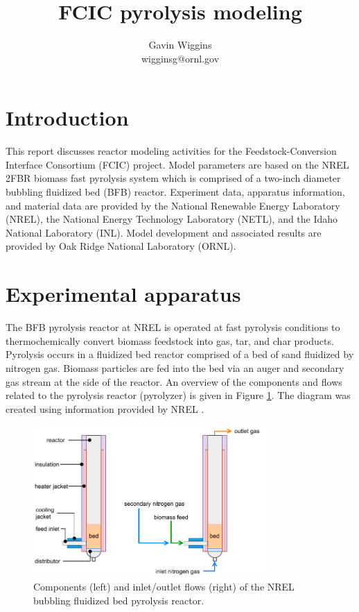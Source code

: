 \documentclass[12pt,titlepage]{article}
\title{FCIC pyrolysis modeling}
\author{Gavin Wiggins \\ wigginsg@ornl.gov}
\begin{document}
\hypersetup{pageanchor=false}
\maketitle
\tableofcontents
\newpage

\section{Introduction}

This report discusses reactor modeling activities for the Feedstock-Conversion Interface Consortium (FCIC) project. Model parameters are based on the NREL 2FBR biomass fast pyrolysis system which is comprised of a two-inch diameter bubbling fluidized bed (BFB) reactor. Experiment data, apparatus information, and material data are provided by the National Renewable Energy Laboratory (NREL), the National Energy Technology Laboratory (NETL), and the Idaho National Laboratory (INL). Model development and associated results are provided by Oak Ridge National Laboratory (ORNL).

\section{Experimental apparatus}

The BFB pyrolysis reactor at NREL is operated at fast pyrolysis conditions to thermochemically convert biomass feedstock into gas, tar, and char products. Pyrolysis occurs in a fluidized bed reactor comprised of a bed of sand fluidized by nitrogen gas. Biomass particles are fed into the bed via an auger and secondary gas stream at the side of the reactor. An overview of the components and flows related to the pyrolysis reactor (pyrolyzer) is given in Figure \ref{fig:pyrolyzer1}. The diagram was created using information provided by NREL \cite{French-2019}.

\begin{figure}[H]
    \centering
    \includegraphics[width=0.8\textwidth]{figures/pyrolyzer1.pdf}
    \caption{Components (left) and inlet/outlet flows (right) of the NREL bubbling fluidized bed pyrolysis reactor.}
    \label{fig:pyrolyzer1}
\end{figure}
\end{document}
